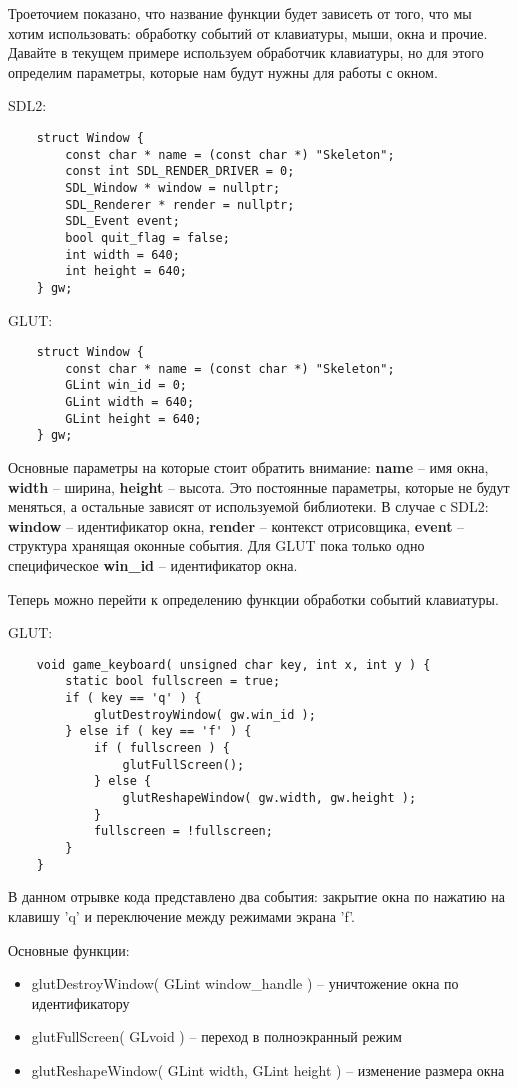 Троеточием показано, что название функции будет зависеть от того, что мы хотим использовать: обработку 
событий от клавиатуры, мыши, окна и прочие. Давайте в текущем примере используем обработчик клавиатуры, но 
для этого определим параметры, которые нам будут нужны для работы с окном.

SDL2:
\begin{lstlisting}
    struct Window {
        const char * name = (const char *) "Skeleton";
        const int SDL_RENDER_DRIVER = 0;
        SDL_Window * window = nullptr;
        SDL_Renderer * render = nullptr;
        SDL_Event event;
        bool quit_flag = false;
        int width = 640;
        int height = 640;
    } gw;
\end{lstlisting}

GLUT:
\begin{lstlisting}
    struct Window {
        const char * name = (const char *) "Skeleton";
        GLint win_id = 0;
        GLint width = 640;
        GLint height = 640;
    } gw;
\end{lstlisting}

Основные параметры на которые стоит обратить внимание: \textbf{name} -- имя окна, \textbf{width} -- ширина, 
\textbf{height} -- высота. Это постоянные параметры, которые не будут меняться, а остальные зависят от используемой библиотеки. В случае с SDL2: \textbf{window} -- идентификатор окна, \textbf{render} -- 
контекст отрисовщика, \textbf{event} -- структура хранящая оконные события. Для GLUT пока только одно 
специфическое \textbf{win\_id} -- идентификатор окна.

Теперь можно перейти к определению функции обработки событий клавиатуры.

GLUT:
\begin{lstlisting}
    void game_keyboard( unsigned char key, int x, int y ) {
        static bool fullscreen = true;
        if ( key == 'q' ) {
            glutDestroyWindow( gw.win_id );
        } else if ( key == 'f' ) {
            if ( fullscreen ) {
                glutFullScreen();
            } else {
                glutReshapeWindow( gw.width, gw.height );
            }
            fullscreen = !fullscreen;
        }
    }
\end{lstlisting}

В данном отрывке кода представлено два события: закрытие окна по нажатию на клавишу 'q' и переключение между 
режимами экрана 'f'.

Основные функции:
\begin{itemize}
    \item glutDestroyWindow( GLint window\_handle ) -- уничтожение окна по идентификатору
    \item glutFullScreen( GLvoid ) -- переход в полноэкранный режим
    \item glutReshapeWindow( GLint width, GLint height ) -- изменение размера окна
\end{itemize}

